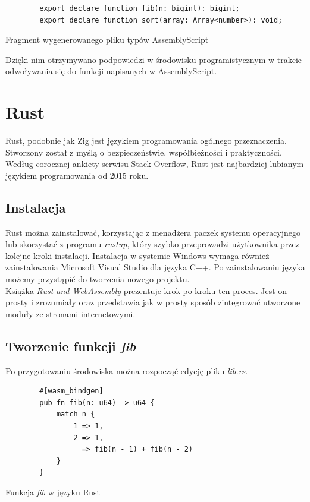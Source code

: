 \documentclass[language=polish,type=master]{aghmodern}
\begin{document}
\begin{listing}[H]
    \begin{verbatim}
        export declare function fib(n: bigint): bigint;
        export declare function sort(array: Array<number>): void;
    \end{verbatim}
    \caption{Fragment wygenerowanego pliku typów AssemblyScript}
\end{listing}

Dzięki nim otrzymywano podpowiedzi w środowisku programistycznym w trakcie odwoływania się do funkcji napisanych w AssemblyScript.

\section{Rust}
Rust, podobnie jak Zig jest językiem programowania ogólnego przeznaczenia.
Stworzony został z myślą o bezpieczeństwie, współbieżności i praktyczności.
Według corocznej ankiety serwisu Stack Overflow\footnotemark{}, Rust jest najbardziej lubianym językiem programowania od 2015 roku.

\subsection{Instalacja}
Rust można zainstalować, korzystając z menadżera paczek systemu operacyjnego lub skorzystać z programu \emph{rustup}\footnotemark{}, który szybko przeprowadzi użytkownika przez kolejne kroki instalacji.
Instalacja w systemie Windows wymaga również zainstalowania Microsoft Visual Studio dla języka C++.
Po zainstalowaniu języka możemy przystąpić do tworzenia nowego projektu. \\
Książka \emph{Rust and WebAssembly}\footnotemark{} prezentuje krok po kroku ten proces.
Jest on prosty i zrozumiały oraz przedstawia jak w prosty sposób zintegrować utworzone moduły ze stronami internetowymi.

\subsection{Tworzenie funkcji \emph{fib}}
Po przygotowaniu środowiska można rozpocząć edycję pliku \emph{lib.rs}.

\begin{listing}[H]
    \begin{verbatim}
        #[wasm_bindgen]
        pub fn fib(n: u64) -> u64 {
            match n {
                1 => 1,
                2 => 1,
                _ => fib(n - 1) + fib(n - 2)
            }
        }
    \end{verbatim}
    \caption{Funkcja \emph{fib} w języku Rust}
\end{listing}
\end{document}
